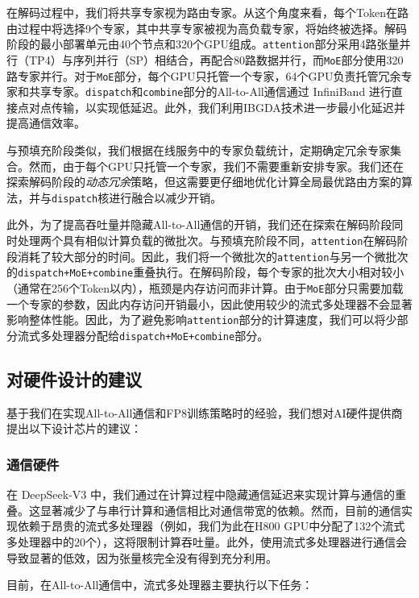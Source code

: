 \documentclass[lang=cn,a4paper,newtx]{elegantpaper}
\newcommand{\dsviii}{DeepSeek-V3}
\begin{document}
在解码过程中，我们将共享专家视为路由专家。从这个角度来看，每个Token在路由过程中将选择9个专家，其中共享专家被视为高负载专家，将始终被选择。解码阶段的最小部署单元由40个节点和320个GPU组成。\texttt{attention}部分采用4路张量并行（TP4）与序列并行（SP）相结合，再配合80路数据并行，而\texttt{MoE}部分使用320路专家并行。对于\texttt{MoE}部分，每个GPU只托管一个专家，64个GPU负责托管冗余专家和共享专家。\texttt{dispatch}和\texttt{combine}部分的All-to-All通信通过 InfiniBand 进行直接点对点传输，以实现低延迟。此外，我们利用IBGDA技术进一步最小化延迟并提高通信效率。

与预填充阶段类似，我们根据在线服务中的专家负载统计，定期确定冗余专家集合。然而，由于每个GPU只托管一个专家，我们不需要重新安排专家。我们还在探索解码阶段的\textit{动态冗余}策略，但这需要更仔细地优化计算全局最优路由方案的算法，并与\texttt{dispatch}核进行融合以减少开销。

此外，为了提高吞吐量并隐藏All-to-All通信的开销，我们还在探索在解码阶段同时处理两个具有相似计算负载的微批次。与预填充阶段不同，\texttt{attention}在解码阶段消耗了较大部分的时间。因此，我们将一个微批次的\texttt{attention}与另一个微批次的\texttt{dispatch+MoE+combine}重叠执行。在解码阶段，每个专家的批次大小相对较小（通常在256个Token以内），瓶颈是内存访问而非计算。由于\texttt{MoE}部分只需要加载一个专家的参数，因此内存访问开销最小，因此使用较少的流式多处理器不会显著影响整体性能。因此，为了避免影响\texttt{attention}部分的计算速度，我们可以将少部分流式多处理器分配给\texttt{dispatch+MoE+combine}部分。

\subsection{对硬件设计的建议}
\label{fp8_hardware_design}

基于我们在实现All-to-All通信和FP8训练策略时的经验，我们想对AI硬件提供商提出以下设计芯片的建议：

\subsubsection{通信硬件}

在 \dsviii{} 中，我们通过在计算过程中隐藏通信延迟来实现计算与通信的重叠。这显著减少了与串行计算和通信相比对通信带宽的依赖。然而，目前的通信实现依赖于昂贵的流式多处理器（例如，我们为此在H800 GPU中分配了132个流式多处理器中的20个），这将限制计算吞吐量。此外，使用流式多处理器进行通信会导致显著的低效，因为张量核完全没有得到充分利用。

目前，在All-to-All通信中，流式多处理器主要执行以下任务：
\end{document}
